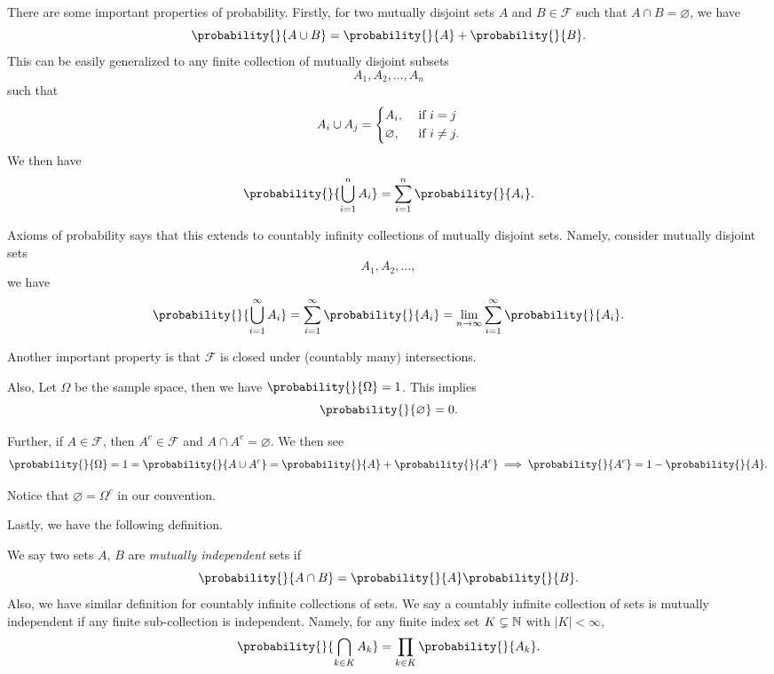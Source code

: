 There are some important properties of probability. Firstly, for two mutually disjoint sets \(A\) and \(B\in\mathcal{F}\) such that \(A\cap B = \varnothing\), we have
\[
	\probability{}{A\cup B} = \probability{}{A} + \probability{}{B}.
\]
This can be easily generalized to any finite collection of mutually disjoint subsets
\[
	A_1, A_2, \ldots , A_n
\]
such that
\[
	A_i \cup A_j = \begin{dcases}
		A_i,         & \text{ if }i = j    \\
		\varnothing, & \text{ if }i\neq j.
	\end{dcases}
\]
We then have \[
	\probability{}{\bigcup\limits_{i = 1}^n A_{i}} = \sum\limits_{i=1}^{n} \probability{}{A_{i}}.
\]
\begin{remark}
	Axioms of probability says that this extends to countably infinity collections of mutually disjoint sets. Namely, consider mutually disjoint sets
	\[
		A_1, A_2, \ldots,
	\]
	we have
	\[
		\probability{}{\bigcup\limits_{i=1}^{\infty} A_{i}} = \sum\limits_{i=1}^{\infty} \probability{}{A_{i}} = \lim_{n \to \infty} \sum\limits_{i=1}^{\infty} \probability{}{A_{i}}.
	\]

	Another important property is that \(\mathcal{F}\) is closed under (countably many) intersections.
\end{remark}

Also, Let \(\Omega\) be the sample space, then we have \(\probability{}{\Omega} = 1\). This implies
\[
	\probability{}{\varnothing } = 0.
\]

Further, if \(A\in\mathcal{F}\), then \(A^{c}\in\mathcal{F}\) and \(A\cap A^{c}= \varnothing \). We then see
\[
	\probability{}{\Omega} = 1 = \probability{}{A\cup A^{c}} = \probability{}{A} + \probability{}{A^{c}} \implies \probability{}{A^{c}} = 1 - \probability{}{A}.
\]

\begin{note}
	Notice that \(\varnothing  = \Omega^{c}\) in our convention.
\end{note}

Lastly, we have the following definition.
\begin{definition}\label{def:mutually-independent}
	We say two sets \(A\), \(B\) are \emph{mutually independent} sets if
	\[
		\probability{}{A\cap B} = \probability{}{A}\probability{}{B}.
	\]
	Also, we have similar definition for countably infinite collections of sets. We say a countably infinite collection of sets is mutually independent if
	any finite sub-collection is independent. Namely, for any finite index set \(K\subsetneq \mathbb{\MakeUppercase{N}}\) with \(\left\vert K \right\vert < \infty \),
	\[
		\probability{}{\bigcap\limits_{k\in K} A_k } = \prod_{k\in K} \probability{}{A_k}.
	\]
\end{definition}

